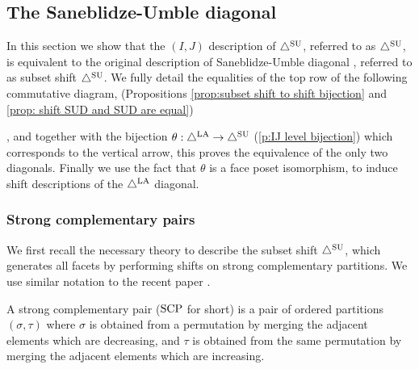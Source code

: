 
\subsection{The Saneblidze-Umble diagonal}

In this section we show that the $(I,J)$ description of $\triangle^{\mathrm{SU}}$, referred to as $\triangle^{\mathrm{SU}}$, is equivalent to the original description of Saneblidze-Umble diagonal \cite{SaneblidzeUmble04}, referred to as subset shift $\triangle^{\mathrm{SU}}$.
We fully detail the equalities of the top row of the following commutative diagram, (Propositions \ref{prop:subset shift to shift bijection} and \ref{prop: shift SUD and SUD are equal})
\begin{center}
\end{center}
, and together with the bijection $\theta:\triangle^{\mathrm{LA}} \to \triangle^{\mathrm{SU}}$ (\cref{p:IJ level bijection}) which corresponds to the vertical arrow, this proves the equivalence of the only two diagonals.
Finally we use the fact that $\theta$ is a face poset isomorphism, to induce shift descriptions of the $\triangle^{\mathrm{LA}}$ diagonal.

\subsubsection{Strong complementary pairs}

We first recall the necessary theory to describe the subset shift $\triangle^{\mathrm{SU}}$, which generates all facets by performing shifts on strong complementary partitions.
We use similar notation to the recent paper \cite{saneblidzeComparingDiagonalsAssociahedra2022}.

\begin{definition}
A strong complementary pair ($\mathrm{SCP}$ for short) is a pair of ordered partitions $(\sigma,\tau)$ where $\sigma$ is obtained from a permutation by merging the adjacent elements which are decreasing, and $\tau$ is obtained from the same permutation by merging the adjacent elements which are increasing.
\end{definition}

